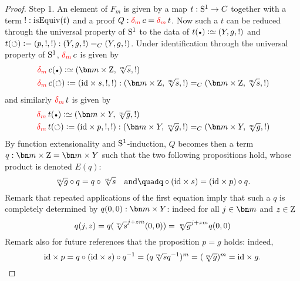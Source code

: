\begin{proof}
  {\sc Step 1.} An element of $F_m$ is given by a map $t:{\mathrm{S}^1} \to C$
  together with a term $!:\mathrm{isEquiv}(t)$ and a proof
  $Q: \dg{m}c = \dg{m}t$. Now such a $t$ can be reduced through
  the universal property of ${\mathrm{S}^1}$ to the data of
  $t(\base)\defequi (Y,g,!)$ and
  $t(\circlearrowleft)\mathrel{\vcentcolon=} (p,!,!): (Y,g,!) =_C (Y,g,!)$. Under identification
  through the universal property of ${\mathrm{S}^1}$, $\dg{m}c$ is given by
  \begin{displaymath}
    \begin{split}
      &\dg{m}c(\base) \defequi (\bn m\times \zet,\sqrt[m] {\etop s},!)\\
      &\dg{m}c(\Sloop) \defis (\id \times {\etop s},!,!): (\bn
      m\times \zet,\sqrt[m] {\etop s},!) =_C (\bn m\times
      \zet,\sqrt[m] {\etop s},!)
    \end{split}
  \end{displaymath}
  and similarly $\dg{m}t$ is given by
  \begin{displaymath}
    \begin{split}
      &\dg{m}t(\base) \defequi (\bn m\times Y,\sqrt[m] g,!)\\
      &\dg{m}t(\Sloop) \defis (\id \times p,!,!): (\bn m\times
      Y,\sqrt[m] g,!) =_C (\bn m\times Y,\sqrt[m] g,!)
    \end{split}
  \end{displaymath}
  By function extensionality and ${\mathrm{S}^1}$-induction, $Q$ becomes then a
  term $q:\bn m\times \zet = \bn m\times Y$ such that the two
  following propositions hold, whose product is denoted $E(q)$:
  \begin{displaymath}
    {\sqrt[m]g} \circ q = q \circ \sqrt[m]{\etop s}%
    \quad\text{and}\quad%
    q \circ (\id \times {\etop s}) = (\id \times p) \circ q.%
  \end{displaymath}
  Remark that repeated applications of the first equation imply that
  such a $q$ is completely determined by
  $\ptoe q (0,0): \bn m\times Y$: indeed for all $j\in\bn m$ and
  $z\in\mathrm{Z}$
  \begin{displaymath}
    \ptoe q (j,z) = \ptoe q ( \sqrt[m]s^{j+zm} (0,0))%
    = \sqrt[m]g^{j+zm} \ptoe q(0,0)%
  \end{displaymath}
  Remark also for future references that the proposition $p=g$ holds:
  indeed,
  \begin{displaymath}
    \mathord{\mathrm{id}} \times p = q \circ (\mathord{\mathrm{id}} \times {{s}}) \circ q^{-1}
    = (q\sqrt[m]{{s}}q^{-1})^m = (\sqrt[m]g)^m = \mathord{\mathrm{id}} \times g.
  \end{displaymath}
  

\end{proof}
